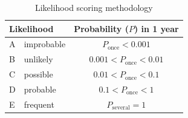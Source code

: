 \begin{table}[H]
\centering
\caption{Likelihood scoring methodology}
\label{tab:likelihood-methodology}
\begin{tabular}{llc}
\toprule
\multicolumn{2}{l}{Likelihood} & Probability ($P$) in 1 year              \\ \midrule
A & improbable & $         P_\mathrm{once} < 0.001 $ \\
B & unlikely   & $ 0.001 < P_\mathrm{once} < 0.01  $ \\
C & possible   & $ 0.01  < P_\mathrm{once} < 0.1   $ \\
D & probable   & $ 0.1   < P_\mathrm{once} < 1     $ \\
E & frequent   & $         P_\mathrm{several} = 1  $ \\ \bottomrule
\end{tabular}
\end{table}


